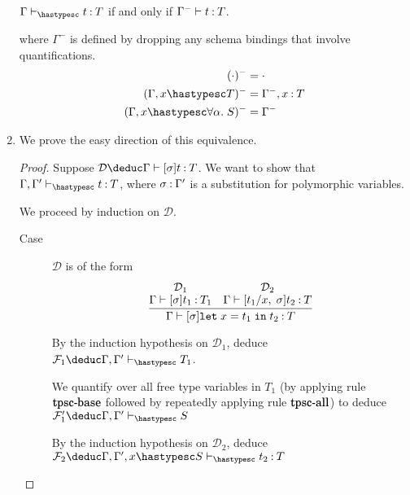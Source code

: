 \documentclass[11pt]{article}
\begin{document}
\begin{enumerate}
    \begin{prop}
      $\Gamma \phts t \hastype T$ if and only if $\Gamma^- \vdash t \mathbin{:} T$.
    \end{prop}
    where $\Gamma^-$ is defined by dropping any schema bindings that involve
    quantifications.
    \begin{align*}
      (\cdot)^- &= \cdot \\
      (\Gamma, x \hastypesc T)^- &= \Gamma^-, x \hastype T \\
      (\Gamma, x \hastypesc \forall \alpha.\; S)^- &= \Gamma^-
    \end{align*}

  \item
    We prove the easy direction of this equivalence.

    \begin{proof}
      Suppose
      $\mathcal{D} \deduc \Gamma \proves [\sigma]t \hastype T$.
      We want to show that $\Gamma, \Gamma^\prime \phts t \hastype T$, where
      $\sigma \mathbin{:} \Gamma^\prime$ is a substitution for polymorphic
      variables.

      We proceed by induction on $\mathcal{D}$.

      \begin{description}
        \item[Case]
          $\mathcal{D}$ is of the form
          \begin{equation*}
            \infer{
              \Gamma \proves [\sigma] \mathtt{let}\; x = t_1 \;\mathtt{in}\; t_2
              \hastype T
            }{
              \deduce[\mathcal{D}_1]{\Gamma \proves [\sigma]t_1 \hastype T_1}{}
              &
              \deduce[\mathcal{D}_2]{\Gamma \proves [t_1/x,\;\sigma]t_2 \hastype T}{}
            }
          \end{equation*}

          By the induction hypothesis on $\mathcal{D}_1$, deduce
          $\mathcal{F}_1 \deduc \Gamma, \Gamma^\prime \phts T_1$.

          We quantify over all free type variables in $T_1$ (by applying rule
          $\mathqd{tpsc-base}$ followed by repeatedly applying rule
          $\mathqd{tpsc-all}$) to deduce
          $\mathcal{F}_1^\prime \deduc \Gamma, \Gamma^\prime \phts S$

          By the induction hypothesis on $\mathcal{D}_2$, deduce
          $\mathcal{F}_2 \deduc
          \Gamma, \Gamma^\prime, x \hastypesc S \phts t_2 \hastype T$


\end{description}
\end{proof}
\end{enumerate}
\end{document}
